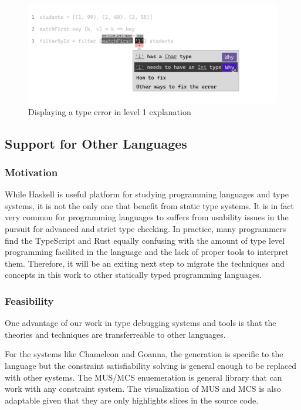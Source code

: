 \begin{figure}[hbt]
  \includegraphics[width=\linewidth]{ExplainError2.pdf}
  \caption{
      Displaying a type error in level 1 explanation
    }
\end{figure}
\subsection{Support for Other Languages}
\subsubsection{Motivation}
While Haskell is useful platform for studying programming languages and type systems, it is not the only one that benefit from static type systems. It is in fact very common for programming languages to suffers from usability issues in the pursuit for advanced and strict type checking. In practice, many programmers find the TypeScript and Rust equally confusing with the amount of type level programming facilited in the language and the lack of proper tools to interpret them. Therefore, it will be an exiting next step to migrate the techniques and concepts in this work to other statically typed programming languages. 

\subsubsection{Feasibility}

One advantage of our work in type debugging systems and tools is that the theories and techniques are transferreable to other languages.  

For the systems like Chameleon and Goanna, the generation is specific to the language but the constraint satisfiability solving is general enough to be replaced with other systems. The MUS/MCS enuemeration is general library that can work with any constraint system. The visualization of MUS and MCS is also adaptable given that they are only highlights slices in the source code.

